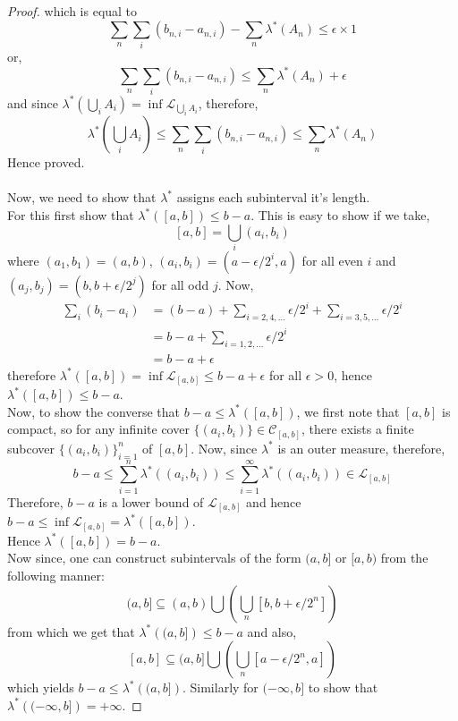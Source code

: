 \documentclass{article}
\theoremstyle{definition}
\theoremstyle{remark}
\theoremstyle{definition}
\theoremstyle{definition}
\theoremstyle{definition}
\newcommand{\bunion}{\bigcup}
\newcommand{\lom}[1]{\lambda^*\left (#1\right )}
\newcommand{\set}[1]{\mathscr{#1}}
\begin{document}
\begin{proof}
	 which is equal to 
	 \[\sum_n \sum_i (b_{n,i}-a_{n,i}) - \sum_n \lom{A_n} \le \epsilon \times 1\]
	 or, 
	 	 \[\sum_n \sum_i (b_{n,i}-a_{n,i}) \le \sum_n \lom{A_n} +\epsilon \]
	 	 and since $ \lom{\bunion_i A_i} = \inf\set{L}_{\bunion_i A_i} $, therefore,
	 	 \[\lom{\bunion_i A_i} \le \sum_n\sum_i (b_{n,i}-a_{n,i}) \le \sum_n\lom{A_n}\]
Hence proved. \\\\
Now, we need to show that $ \lambda^* $ assigns each subinterval it's length.\\
For this first show that $ \lom{[a,b]} \le b-a $. This is easy to show if we take,
\[[a,b] = \bunion_{i} (a_i,b_i)\]
where $ (a_1,b_1) = (a,b) $, $ (a_i,b_i) = (a-\epsilon/2^i,a) $ for all even $ i $ and $ (a_j,b_j) = (b,b+\epsilon/2^j) $ for all odd $ j $. Now,
\begin{equation*}
	\begin{split}
		\sum_i (b_i-a_i) &= (b-a) + \sum_{i=2,4,\dots} \epsilon/2^i + \sum_{i=3,5,\dots} \epsilon/2^i\\
		&= b-a + \sum_{i=1,2,\dots} \epsilon/2^i\\
		&= b-a + \epsilon
	\end{split}
\end{equation*}
therefore $ \lom{[a,b]} = \inf \set{L}_{[a,b]} \le b-a + \epsilon $ for all $ \epsilon>0 $, hence $ \lom{[a,b]} \le b-a $. \\
Now, to show the converse that $ b-a \le\lom{[a,b]} $, we first note that $ [a,b] $ is compact, so for any infinite cover $ \{(a_i,b_i)\} \in \set{C}_{[a,b]} $, there exists a finite subcover $ \{(a_i,b_i)\}_{i=1}^n $ of $ [a,b] $. Now, since $ \lambda^* $ is an outer measure, therefore,
\[  b-a \le \sum_{i=1}^n \lom{(a_i,b_i)}\le \sum_{i=1}^\infty \lom{(a_i,b_i)} \in \set{L}_{[a,b]} \] 
Therefore, $ b-a $ is a lower bound of $ \set{L}_{[a,b]} $ and hence $ b-a \le \inf \set{L}_{[a,b]} = \lom{[a,b]} $.\\
Hence $ \lom{[a,b]} = b-a $.\\
Now since, one can construct subintervals of the form $ (a,b] $ or $ [a,b) $ from the following manner:
\[(a,b] \subseteq (a,b) \bunion \left (\bunion_{n}[b,b+\epsilon/2^n]\right )\]
from which we get that $ \lom{(a,b]} \le b-a  $ and also,
\[[a,b] \subseteq (a,b] \bunion \left ( \bunion_n [a-\epsilon/2^n ,a] \right )\]
which yields $ b-a \le \lom{(a,b]} $. Similarly for $ (-\infty,b] $ to show that $ \lom{(-\infty,b]} = +\infty $. 
\end{proof}
\hrulefill
\newpage
\end{document}
